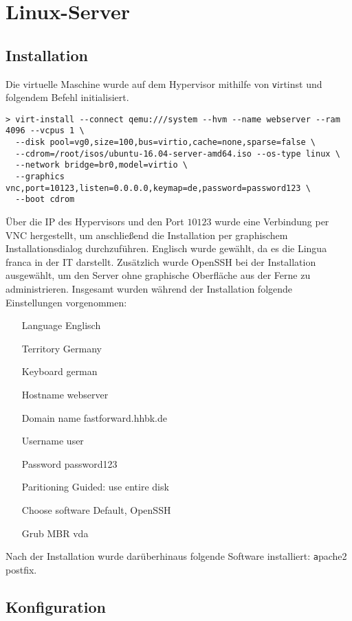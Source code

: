 \section{Linux-Server}

\subsection{Installation}

Die virtuelle Maschine wurde auf dem Hypervisor mithilfe von {\texttt virtinst} und folgendem Befehl initialisiert.

\begin{lstlisting}[numbers=none]
> virt-install --connect qemu:///system --hvm --name webserver --ram 4096 --vcpus 1 \
  --disk pool=vg0,size=100,bus=virtio,cache=none,sparse=false \
  --cdrom=/root/isos/ubuntu-16.04-server-amd64.iso --os-type linux \
  --network bridge=br0,model=virtio \
  --graphics vnc,port=10123,listen=0.0.0.0,keymap=de,password=password123 \
  --boot cdrom
\end{lstlisting}

Über die IP des Hypervisors und den Port $10123$ wurde eine Verbindung per VNC hergestellt, um anschließend die Installation per graphischem Installationsdialog durchzuführen. Englisch wurde gewählt, da es die Lingua franca in der IT darstellt. Zusätzlich wurde OpenSSH bei der Installation ausgewählt, um den Server ohne graphische Oberfläche aus der Ferne zu administrieren. Insgesamt wurden während der Installation folgende Einstellungen vorgenommen:
\begin{itemize}[leftmargin=+1in]
	\item[Language] Englisch
	\item[Territory] Germany
	\item[Keyboard] german
	\item[Hostname] webserver
	\item[Domain name] fastforward.hhbk.de
	\item[Username] user
	\item[Password] password123
	\item[Paritioning] Guided: use entire disk
	\item[Choose software] Default, OpenSSH
	\item[Grub MBR] vda
\end{itemize}

Nach der Installation wurde darüberhinaus folgende Software installiert: {\texttt apache2 postfix}.

\subsection{Konfiguration}

